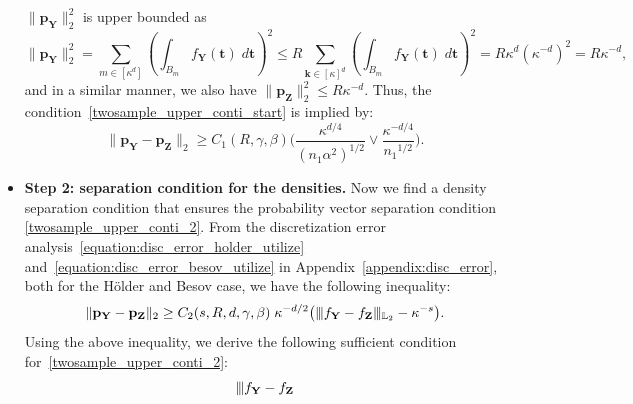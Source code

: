\documentclass[twoside,11pt]{article}
\newcommand\numberthis{\addtocounter{equation}{1}\tag{\theequation}}
\newcommand{\Ell}{\mathbb{L}}
\newcommand{\EllTwo}{\Ell_2} %
\newcommand{\rvTwo}{Y}
\newcommand{\rvThree}{Z}
\newcommand{\vectorize}[1]{\mathbf{#1}}
\newcommand{\dimDensity}{d} %
\newcommand{\vectorIndex}{m}
\newcommand{\sampleSize}{n}
\newcommand{\probVec}{\mathbf{p}} %
\newcommand{\smoothness}{s}
\newcommand{\ballRadius}{R}
\newcommand{\privacyParameter}{\alpha} %
\newcommand{\maxErrorTypeTwo}{\beta} %
\newcommand{\maxErrorTypeOne}{\gamma} %
\newcommand{\binNum}{\kappa}           %
\newcommand{\wavFatherUnivIndex}{k}
\newcommand{\wavFatherIndex}{\boldsymbol{\wavFatherUnivIndex}}
\begin{document}
\begin{appendix}
\begin{itemize}
	$\| \probVec_{\vectorize{\rvTwo}} \|_2^2$ is upper bounded as
	\begin{equation*}
		\|
		\probVec_{\vectorize{\rvTwo}}
		\|_2^2
		=
		\sum_{\vectorIndex \in [\binNum^\dimDensity]}
		\left(
		\int_{B_\vectorIndex}
		f_{\vectorize{Y}}(\vectorize{t})\;
		d\vectorize{t}
		\right)^2
		\leq
		\ballRadius
		\sum_{\wavFatherIndex \in [\binNum]^\dimDensity}
		\left(
		\int_{B_\vectorIndex}
		f_{\vectorize{Y}}(\vectorize{t})\;
		d\vectorize{t}
		\right)^2 =
		\ballRadius
		\binNum^\dimDensity
		(\binNum^{-\dimDensity})^2
		=
		\ballRadius
		\binNum^{-\dimDensity},
	\end{equation*}
	and in a similar manner, we also have $\| \probVec_{\vectorize{\rvThree}} \|_2^2 \leq \ballRadius
	\binNum^{-\dimDensity}$.
	Thus, the condition~\eqref{twosample_upper_conti_start} is implied by:
	\begin{equation}\label{twosample_upper_conti_2}
		\| \probVec_{\vectorize{\rvTwo}} - \probVec_{\vectorize{\rvThree}} \|_2
		\geq
		C_1( \ballRadius, \maxErrorTypeOne, \maxErrorTypeTwo)
		\biggl(
		\frac
		{\binNum^{\dimDensity/4}}
		{(\sampleSize_1 \privacyParameter^2)^{1/2}} 
		\vee
		\frac
		{\binNum^{-\dimDensity/4}}
		{{\sampleSize_1}^{1/2}}
		\biggr).
	\end{equation}
	\item \textbf{Step 2: separation condition for the densities.}
	Now we find a density separation condition  that ensures the probability vector separation condition \eqref{twosample_upper_conti_2}. 
	From the discretization error analysis~\eqref{equation:disc_error_holder_utilize} and~\eqref{equation:disc_error_besov_utilize} in Appendix~\ref{appendix:disc_error}, both for the H\"{o}lder and Besov case, we have the following inequality:
	\begin{equation*}
		\|\probVec_{\vectorize{\rvTwo}}- \probVec_{\vectorize{\rvThree}}\|_2
		\geq
		C_2(\smoothness, \ballRadius, \dimDensity, \maxErrorTypeOne, \maxErrorTypeTwo)
		\;
		\binNum^{-\dimDensity/2}
		\bigl(
		\vert\kern-0.25ex
		\vert\kern-0.25ex
		\vert
		f_{\vectorize{Y}} - f_{\vectorize{Z}}
		\vert\kern-0.25ex
		\vert\kern-0.25ex
		\vert_{\EllTwo}
		-
		\binNum^{-\smoothness}
		\bigr).
	\end{equation*}
	Using the above inequality,  we derive the following sufficient condition for~\eqref{twosample_upper_conti_2}:
	\begin{align*}
		\vert\kern-0.25ex
		\vert\kern-0.25ex
		\vert
		f_{\vectorize{Y}} - f_{\vectorize{Z}}

\end{align*}
\end{itemize}
\end{appendix}
\end{document}
